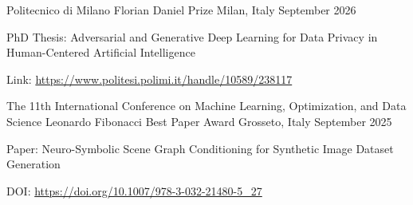 
\begin{cventries}

    \vspace{2mm}
    \cventry
        {Politecnico di Milano}
        {Florian Daniel Prize}
        {Milan, Italy}
        {September 2026}
        {
        \begin{cvitems}
            \item {PhD Thesis: Adversarial and Generative Deep Learning for Data Privacy in Human-Centered Artificial Intelligence}
            \item {Link: \url{https://www.politesi.polimi.it/handle/10589/238117}}
        \end{cvitems}
        }

    \vspace{2mm}
    \cventry
        {The 11th International Conference on Machine Learning, Optimization, and Data Science}
        {Leonardo Fibonacci Best Paper Award}
        {Grosseto, Italy}
        {September 2025}
        {
        \begin{cvitems}
            \item {Paper: Neuro-Symbolic Scene Graph Conditioning for Synthetic Image Dataset Generation}
            \item {DOI: \url{https://doi.org/10.1007/978-3-032-21480-5_27}}
        \end{cvitems}
        }     


\end{cventries}